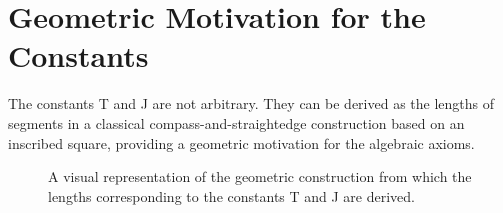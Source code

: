 \documentclass{amsart}
\theoremstyle{plain}
\theoremstyle{definition}
\theoremstyle{remark}
\begin{document}
\appendix
\section{Geometric Motivation for the Constants}
The constants T and J are not arbitrary. They can be derived as the lengths of segments in a classical compass-and-straightedge construction based on an inscribed square, providing a geometric motivation for the algebraic axioms.

\begin{figure}[h!]
    \centering
    \caption{A visual representation of the geometric construction from which the lengths corresponding to the constants T and J are derived. }
    \label{fig:geometry}
\end{figure}
\end{document}
